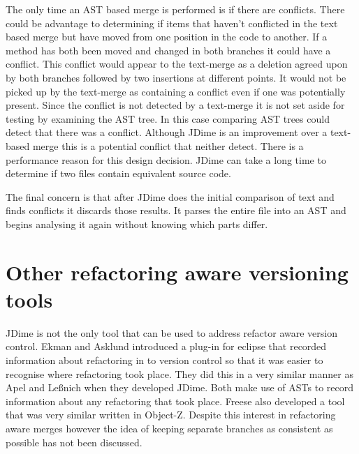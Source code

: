 The only time an AST based merge is performed is if there are conflicts.  There could be advantage to determining if items that haven't conflicted in the text based merge but have moved from one position in the code to another.  If a method has both been moved and changed in both branches it could have a conflict.  This conflict would appear to the text-merge as a deletion agreed upon by both branches followed by two insertions at different points.  It would not be picked up by the text-merge as containing a conflict even if one was potentially present.  Since the conflict is not detected by a text-merge it is not set aside for testing by examining the AST tree. In this case comparing AST trees could detect that there was a conflict. Although JDime is an improvement over a text-based merge this is a potential conflict that neither detect. There is a performance reason for this design decision. JDime can take a long time to determine if two files contain equivalent source code.

The final concern is that after JDime does the initial comparison of text and finds conflicts it discards those results. It parses the entire file into an AST and begins analysing it again without knowing which parts differ.   

\section{Other refactoring aware versioning tools}
JDime is not the only tool that can be used to address refactor aware version control.  Ekman and Asklund \cite{Ekman2004} introduced a plug-in for eclipse that recorded information about refactoring in to version control so that it was easier to recognise where refactoring took place.  They did this in a very similar manner as Apel and Le{\ss}nich when they developed JDime.  Both make use of ASTs to record information about any refactoring that took place.  Freese \cite{Freese2006} also developed a tool that was very similar written in Object-Z. Despite this interest in refactoring aware merges however the idea of keeping separate branches as consistent as possible has not been discussed.
